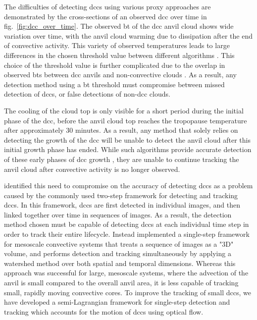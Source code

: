 The difficulties of detecting \acrshort{dcc}s using various proxy approaches are demonstrated by the cross-sections of an observed \acrshort{dcc} over time in fig.~\ref{fig:dcc_over_time}.
The observed \acrshort{bt} of the \acrshort{dcc} anvil cloud shows wide variation over time, with the anvil cloud warming due to dissipation after the end of convective activity.
This variety of observed temperatures leads to large differences in the chosen threshold value between different algorithms \citep[see discussion in][]{bennartz_convective_2012}.
This choice of the threshold value is further complicated due to the overlap in observed \acrshort{bt}s between \acrshort{dcc} anvils and non-convective clouds \citep{konduru_new_2013}.
As a result, any detection method using a \acrshort{bt} threshold must compromise between missed detection of \acrshort{dcc}s, or false detections of non-\acrshort{dcc} clouds.

The cooling of the cloud top is only visible for a short period during the initial phase of the \acrshort{dcc}, before the anvil cloud top reaches the tropopause temperature after approximately 30 minutes.
As a result, any method that solely relies on detecting the growth of the \acrshort{dcc} will be unable to detect the anvil cloud after this initial growth phase has ended.
While such algorithms provide accurate detection of these early phases of \acrshort{dcc} growth \citep{zinner_validation_2013}, they are unable to continue tracking the anvil cloud after convective activity is no longer observed.

\citet{fiolleau_algorithm_2013} identified this need to compromise on the accuracy of detecting \acrshort{dcc}s as a problem caused by the commonly used two-step framework for detecting and tracking \acrshort{dcc}s.
In this framework, \acrshort{dcc}s are first detected in individual images, and then linked together over time in sequences of images.
As a result, the detection method chosen must be capable of detecting \acrshort{dcc}s at each individual time step in order to track their entire lifecycle.
Instead \citet{fiolleau_algorithm_2013} implemented a single-step framework for mesoscale convective systems that treats a sequence of images as a "3D" volume, and performs detection and tracking simultaneously by applying a watershed method over both spatial and temporal dimensions.
Whereas this approach was successful for large, mesoscale systems, where the advection of the anvil is small compared to the overall anvil area, it is less capable of tracking small, rapidly moving convective cores.
To improve the tracking of small \acrshort{dcc}s, we have developed a semi-Lagrangian framework for single-step detection and tracking which accounts for the motion of \acrshort{dcc}s using optical flow.

